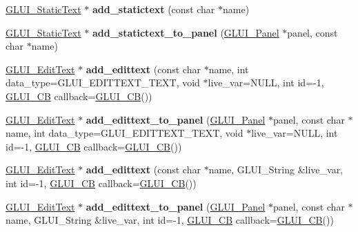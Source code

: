 \begin{DoxyCompactItemize}
\item 
\hypertarget{classGLUI_ab12fd9cb4ff1fa696458bc28353a9dfa}{\hyperlink{classGLUI__StaticText}{G\-L\-U\-I\-\_\-\-Static\-Text} $\ast$ {\bfseries add\-\_\-statictext} (const char $\ast$name)}\label{classGLUI_ab12fd9cb4ff1fa696458bc28353a9dfa}

\item 
\hypertarget{classGLUI_a1c08c219655f0046817985d12deccf1e}{\hyperlink{classGLUI__StaticText}{G\-L\-U\-I\-\_\-\-Static\-Text} $\ast$ {\bfseries add\-\_\-statictext\-\_\-to\-\_\-panel} (\hyperlink{classGLUI__Panel}{G\-L\-U\-I\-\_\-\-Panel} $\ast$panel, const char $\ast$name)}\label{classGLUI_a1c08c219655f0046817985d12deccf1e}

\item 
\hypertarget{classGLUI_a30485f08311b1d93e7e1b3668207bdd8}{\hyperlink{classGLUI__EditText}{G\-L\-U\-I\-\_\-\-Edit\-Text} $\ast$ {\bfseries add\-\_\-edittext} (const char $\ast$name, int data\-\_\-type=G\-L\-U\-I\-\_\-\-E\-D\-I\-T\-T\-E\-X\-T\-\_\-\-T\-E\-X\-T, void $\ast$live\-\_\-var=N\-U\-L\-L, int id=-\/1, \hyperlink{classGLUI__CB}{G\-L\-U\-I\-\_\-\-C\-B} callback=\hyperlink{classGLUI__CB}{G\-L\-U\-I\-\_\-\-C\-B}())}\label{classGLUI_a30485f08311b1d93e7e1b3668207bdd8}

\item 
\hypertarget{classGLUI_a9f653ae354820e773d70d0d6941991ae}{\hyperlink{classGLUI__EditText}{G\-L\-U\-I\-\_\-\-Edit\-Text} $\ast$ {\bfseries add\-\_\-edittext\-\_\-to\-\_\-panel} (\hyperlink{classGLUI__Panel}{G\-L\-U\-I\-\_\-\-Panel} $\ast$panel, const char $\ast$name, int data\-\_\-type=G\-L\-U\-I\-\_\-\-E\-D\-I\-T\-T\-E\-X\-T\-\_\-\-T\-E\-X\-T, void $\ast$live\-\_\-var=N\-U\-L\-L, int id=-\/1, \hyperlink{classGLUI__CB}{G\-L\-U\-I\-\_\-\-C\-B} callback=\hyperlink{classGLUI__CB}{G\-L\-U\-I\-\_\-\-C\-B}())}\label{classGLUI_a9f653ae354820e773d70d0d6941991ae}

\item 
\hypertarget{classGLUI_a151c92cdfb84eef5c16cdd3f7276fa93}{\hyperlink{classGLUI__EditText}{G\-L\-U\-I\-\_\-\-Edit\-Text} $\ast$ {\bfseries add\-\_\-edittext} (const char $\ast$name, G\-L\-U\-I\-\_\-\-String \&live\-\_\-var, int id=-\/1, \hyperlink{classGLUI__CB}{G\-L\-U\-I\-\_\-\-C\-B} callback=\hyperlink{classGLUI__CB}{G\-L\-U\-I\-\_\-\-C\-B}())}\label{classGLUI_a151c92cdfb84eef5c16cdd3f7276fa93}

\item 
\hypertarget{classGLUI_a3cad8e9c9c67f0c0cafa7ecc730c0a51}{\hyperlink{classGLUI__EditText}{G\-L\-U\-I\-\_\-\-Edit\-Text} $\ast$ {\bfseries add\-\_\-edittext\-\_\-to\-\_\-panel} (\hyperlink{classGLUI__Panel}{G\-L\-U\-I\-\_\-\-Panel} $\ast$panel, const char $\ast$name, G\-L\-U\-I\-\_\-\-String \&live\-\_\-var, int id=-\/1, \hyperlink{classGLUI__CB}{G\-L\-U\-I\-\_\-\-C\-B} callback=\hyperlink{classGLUI__CB}{G\-L\-U\-I\-\_\-\-C\-B}())}\label{classGLUI_a3cad8e9c9c67f0c0cafa7ecc730c0a51}


\end{DoxyCompactItemize}
